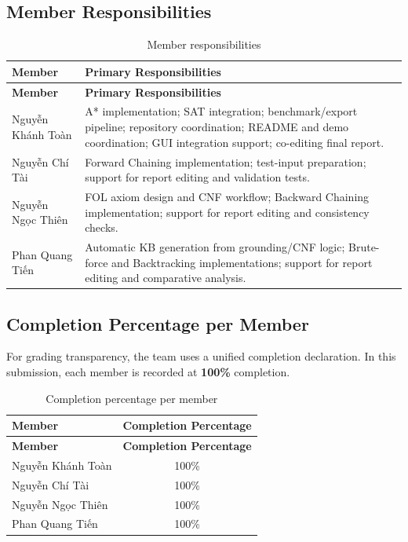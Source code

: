 \subsection{Member Responsibilities}
{\small
\begin{longtable}{|>{\RaggedRight\arraybackslash}p{4.1cm}|>{\RaggedRight\arraybackslash}p{10.1cm}|}
\caption{Member responsibilities}\label{tab:member-responsibilities}\\
\hline
\textbf{Member} & \textbf{Primary Responsibilities} \\
\hline
\endfirsthead
\hline
\textbf{Member} & \textbf{Primary Responsibilities} \\
\hline
\endhead
\hline
\endfoot
\hline
\endlastfoot
Nguyễn Khánh Toàn & A* implementation; SAT integration; benchmark/export pipeline; repository coordination; README and demo coordination; GUI integration support; co-editing final report. \\
\hline
Nguyễn Chí Tài & Forward Chaining implementation; test-input preparation; support for report editing and validation tests. \\
\hline
Nguyễn Ngọc Thiên & FOL axiom design and CNF workflow; Backward Chaining implementation; support for report editing and consistency checks. \\
\hline
Phan Quang Tiến & Automatic KB generation from grounding/CNF logic; Brute-force and Backtracking implementations; support for report editing and comparative analysis. \\
\hline
\end{longtable}
}

\subsection{Completion Percentage per Member}
For grading transparency, the team uses a unified completion declaration. In this submission, each member is recorded at \textbf{100\%} completion.

\begin{longtable}{|>{\RaggedRight\arraybackslash}p{8.8cm}|c|}
\caption{Completion percentage per member}\label{tab:completion-per-member}\\
\hline
\textbf{Member} & \textbf{Completion Percentage} \\
\hline
\endfirsthead
\hline
\textbf{Member} & \textbf{Completion Percentage} \\
\hline
\endhead
\hline
\endfoot
\hline
\endlastfoot
Nguyễn Khánh Toàn & 100\% \\
\hline
Nguyễn Chí Tài & 100\% \\
\hline
Nguyễn Ngọc Thiên & 100\% \\
\hline
Phan Quang Tiến & 100\% \\
\hline
\end{longtable}

